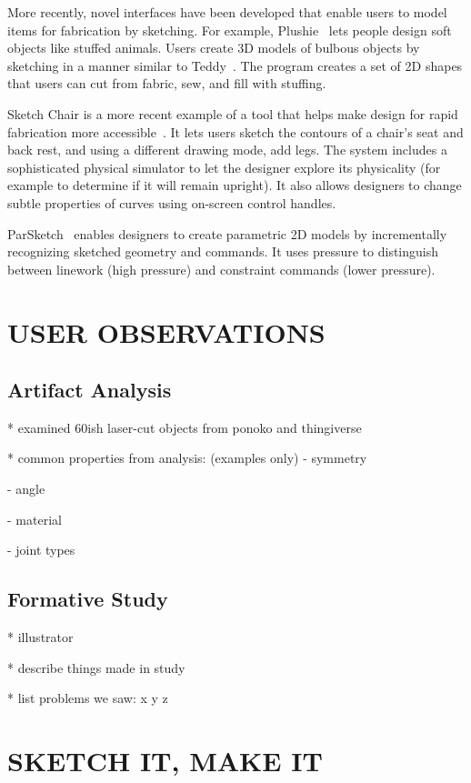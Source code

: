 \documentclass{article}
\begin{document}
More recently, novel interfaces have been developed that enable users
to model items for fabrication by sketching. For example,
Plushie~\cite{mori-plushie} lets people design soft objects like
stuffed animals. Users create 3D models of bulbous objects by
sketching in a manner similar to Teddy~\cite{igarashi-teddy}. The
program creates a set of 2D shapes that users can cut from fabric,
sew, and fill with stuffing. 

Sketch Chair is a more recent example of a tool that helps make design
for rapid fabrication more accessible~\cite{saul-sketch-chair}. It
lets users sketch the contours of a chair's seat and back rest, and
using a different drawing mode, add legs. The system includes a
sophisticated physical simulator to let the designer explore its
physicality (for example to determine if it will remain upright). It
also allows designers to change subtle properties of curves using
on-screen control handles.

ParSketch~\cite{naya-parsketch} enables designers to create parametric
2D models by incrementally recognizing sketched geometry and
commands. It uses pressure to distinguish between linework (high
pressure) and constraint commands (lower pressure).

\section{USER OBSERVATIONS}

\subsection{Artifact Analysis}

* examined 60ish laser-cut objects from ponoko and thingiverse

* common properties from analysis: (examples only)
  - symmetry

  - angle

  - material

  - joint types

\subsection{Formative Study}
\label{sec:formative}

* illustrator

* describe things made in study

* list problems we saw: x y z


\section{SKETCH IT, MAKE IT}
\end{document}
